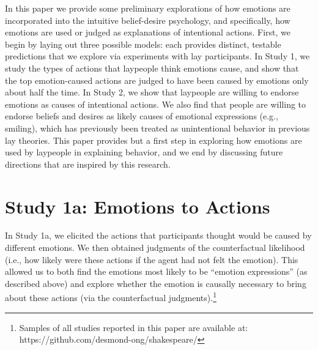 \documentclass[10pt,letterpaper]{article}
\begin{document}
In this paper we provide some preliminary explorations of how emotions are incorporated into the intuitive belief-desire psychology, and specifically, how emotions are used or judged as explanations of intentional actions. First, we begin by laying out three possible models: each provides distinct, testable predictions that we explore via experiments with lay participants. In Study 1, we study the types of actions that laypeople think emotions cause, and show that the top emotion-caused actions are judged to have been caused by emotions only about half the time. In Study 2, we show that laypeople are willing to endorse emotions as causes of intentional actions. We also find that people are willing to endorse beliefs and desires as likely causes of emotional expressions (e.g., smiling), which has previously been treated as unintentional behavior in previous lay theories. This paper provides but a first step in exploring how emotions are used by laypeople in explaining behavior, and we end by discussing future directions that are inspired by this research.





\section{Study 1a: Emotions to Actions}

	In Study 1a, we elicited the actions that participants thought would be caused by different emotions. We then obtained judgments of the counterfactual likelihood (i.e., how likely were these actions if the agent had not felt the emotion). This allowed us to both find the emotions most likely to be ``emotion expressions'' (as described above) and explore whether the emotion is causally necessary to bring about these actions (via the counterfactual judgments).\footnote{Samples of all studies reported in this paper are available at: https://github.com/desmond-ong/shakespeare/}

\end{document}
